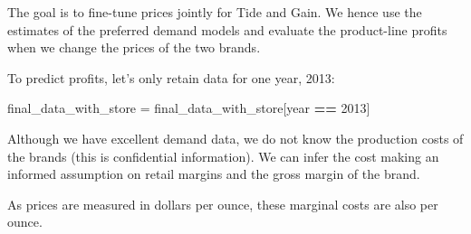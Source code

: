 \documentclass[
]{article}
\newenvironment{Shaded}{\begin{snugshade}}{\end{snugshade}}
\newcommand{\AttributeTok}[1]{\textcolor[rgb]{0.13,0.29,0.53}{#1}}
\newcommand{\ConstantTok}[1]{\textcolor[rgb]{0.56,0.35,0.01}{#1}}
\newcommand{\DecValTok}[1]{\textcolor[rgb]{0.00,0.00,0.81}{#1}}
\newcommand{\FloatTok}[1]{\textcolor[rgb]{0.00,0.00,0.81}{#1}}
\newcommand{\FunctionTok}[1]{\textcolor[rgb]{0.13,0.29,0.53}{\textbf{#1}}}
\newcommand{\NormalTok}[1]{#1}
\newcommand{\OtherTok}[1]{\textcolor[rgb]{0.56,0.35,0.01}{#1}}
\newcommand{\SpecialCharTok}[1]{\textcolor[rgb]{0.81,0.36,0.00}{\textbf{#1}}}
\begin{document}
The goal is to fine-tune prices jointly for Tide and Gain. We hence use
the estimates of the preferred demand models and evaluate the
product-line profits when we change the prices of the two brands.

\bigskip

To predict profits, let's only retain data for one year, 2013:

\begin{Shaded}
\begin{Highlighting}[]
\NormalTok{final\_data\_with\_store }\OtherTok{=}\NormalTok{ final\_data\_with\_store[year }\SpecialCharTok{==} \DecValTok{2013}\NormalTok{]}
\end{Highlighting}
\end{Shaded}

\bigskip

Although we have excellent demand data, we do not know the production
costs of the brands (this is confidential information). We can infer the
cost making an informed assumption on retail margins and the gross
margin of the brand.

\begin{Shaded}
\end{Shaded}

As prices are measured in dollars per ounce, these marginal costs are
also per ounce.
\end{document}

